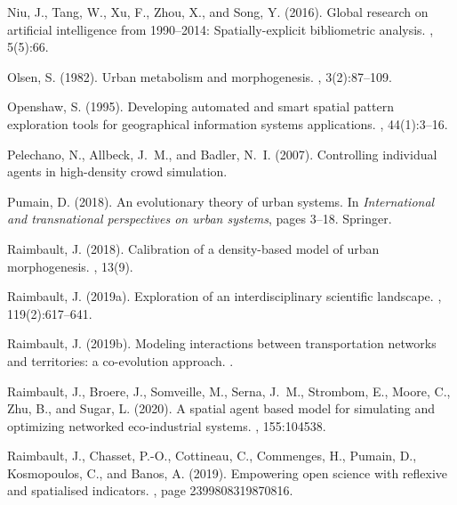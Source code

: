 \documentclass[letterpaper]{article}
\begin{document}
\begin{thebibliography}{}
Niu, J., Tang, W., Xu, F., Zhou, X., and Song, Y. (2016).
\newblock Global research on artificial intelligence from 1990--2014:
  Spatially-explicit bibliometric analysis.
, 5(5):66.

Olsen, S. (1982).
\newblock Urban metabolism and morphogenesis.
, 3(2):87--109.

Openshaw, S. (1995).
\newblock Developing automated and smart spatial pattern exploration tools for
  geographical information systems applications.
, 44(1):3--16.

Pelechano, N., Allbeck, J.~M., and Badler, N.~I. (2007).
\newblock Controlling individual agents in high-density crowd simulation.

Pumain, D. (2018).
\newblock An evolutionary theory of urban systems.
\newblock In {\em International and transnational perspectives on urban
  systems}, pages 3--18. Springer.

Raimbault, J. (2018).
\newblock Calibration of a density-based model of urban morphogenesis.
, 13(9).

Raimbault, J. (2019a).
\newblock Exploration of an interdisciplinary scientific landscape.
, 119(2):617--641.

Raimbault, J. (2019b).
\newblock Modeling interactions between transportation networks and
  territories: a co-evolution approach.
.

Raimbault, J., Broere, J., Somveille, M., Serna, J.~M., Strombom, E., Moore,
  C., Zhu, B., and Sugar, L. (2020).
\newblock A spatial agent based model for simulating and optimizing networked
  eco-industrial systems.
, 155:104538.

Raimbault, J., Chasset, P.-O., Cottineau, C., Commenges, H., Pumain, D.,
  Kosmopoulos, C., and Banos, A. (2019).
\newblock Empowering open science with reflexive and spatialised indicators.
,
  page 2399808319870816.


\end{thebibliography}
\end{document}
